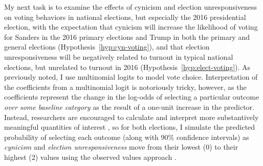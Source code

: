 \documentclass[12pt]{article}
\begin{document}
	
My next task is to examine the effects of cynicism and election unresponsiveness on voting behaviors in national elections, but especially the 2016 presidential election, with the expectation that cynicism will increase the likelihood of voting for Sanders in the 2016 primary elections and Trump in both the primary and general elections (Hypothesis~\ref{hyp:cyn-voting}), and that election unresponsiveness will be negatively related to turnout in typical national elections, but unrelated to turnout in 2016 (Hypothesis~\ref{hyp:elect-voting}). As previously noted, I use multinomial logits to model vote choice. Interpretation of the coefficients from a multinomial logit is notoriously tricky, however, as the coefficients represent the change in the log-odds of selecting a particular outcome \textit{over some baseline category} as the result of a one-unit increase in the predictor. Instead, researchers are encouraged to calculate and interpret more substantively meaningful quantities of interest \parencite{king2000making,paolino2020predicted}, so for both elections, I simulate the predicted probability of selecting each outcome (along with 90\% confidence intervals) as \textit{cynicism} and \textit{election unresponsiveness} move from their lowest (0) to their highest (2) values using the observed values approach \parencite{hanmer2013behind}.
\end{document}
